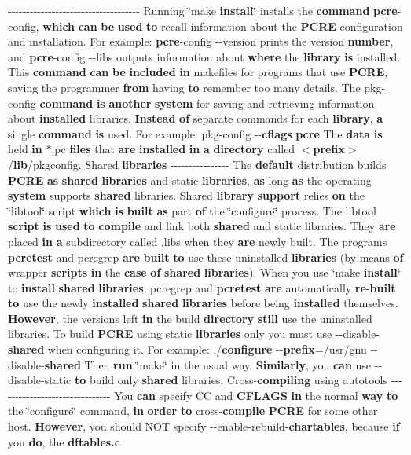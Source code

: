 -\/-\/-\/-\/-\/-\/-\/-\/-\/-\/-\/-\/-\/-\/-\/-\/-\/-\/-\/-\/-\/-\/-\/-\/-\/-\/-\/-\/-\/-\/-\/-\/-\/-\/-\/-\/ Running \char`\"{}make {\bf install}\char`\"{} installs the {\bf command} {\bf pcre}-\/config, {\bf which} {\bf can} {\bf be} {\bf used} {\bf to} recall information about the {\bf P\+C\+RE} configuration and installation. For example\+: {\bf pcre}-\/config -\/-\/version prints the version {\bf number}, and {\bf pcre}-\/config -\/-\/libs outputs information about {\bf where} the {\bf library} {\bf is} installed. This {\bf command} {\bf can} {\bf be} {\bf included} {\bf in} makefiles for programs that use {\bf P\+C\+RE}, saving the programmer {\bf from} having {\bf to} remember too many details. The pkg-\/config {\bf command} {\bf is} {\bf another} {\bf system} for saving and retrieving information about {\bf installed} libraries. {\bf Instead} {\bf of} separate commands for each {\bf library}, {\bf a} single {\bf command} {\bf is} used. For example\+: pkg-\/config -\/-\/{\bf cflags} {\bf pcre} The {\bf data} {\bf is} held {\bf in} $\ast$.pc {\bf files} that {\bf are} {\bf installed} {\bf in} {\bf a} {\bf directory} called $<${\bf prefix}$>$/{\bf lib}/pkgconfig. Shared {\bf libraries} -\/-\/-\/-\/-\/-\/-\/-\/-\/-\/-\/-\/-\/-\/-\/-\/ The {\bf default} distribution builds {\bf P\+C\+RE} {\bf as} {\bf shared} {\bf libraries} and static {\bf libraries}, {\bf as} long {\bf as} the operating {\bf system} supports {\bf shared} libraries. Shared {\bf library} {\bf support} relies {\bf on} the \char`\"{}libtool\char`\"{} script {\bf which} {\bf is} {\bf built} {\bf as} part {\bf of} the \char`\"{}configure\char`\"{} process. The libtool {\bf script} {\bf is} {\bf used} {\bf to} {\bf compile} and link both {\bf shared} and static libraries. They {\bf are} placed {\bf in} {\bf a} subdirectory called .libs when they {\bf are} newly built. The programs {\bf pcretest} and pcregrep {\bf are} {\bf built} {\bf to} use these uninstalled {\bf libraries} (by means {\bf of} wrapper {\bf scripts} {\bf in} the {\bf case} {\bf of} {\bf shared} {\bf libraries}). When you use \char`\"{}make {\bf install}\char`\"{} to {\bf install} {\bf shared} {\bf libraries}, pcregrep and {\bf pcretest} {\bf are} automatically {\bf re}-\/{\bf built} {\bf to} use the newly {\bf installed} {\bf shared} {\bf libraries} before being {\bf installed} themselves. {\bf However}, the versions left {\bf in} the build {\bf directory} {\bf still} use the uninstalled libraries. To build {\bf P\+C\+RE} using static {\bf libraries} only you must use -\/-\/disable-\/{\bf shared} when configuring it. For example\+: ./{\bf configure} -\/-\/{\bf prefix}=/usr/gnu -\/-\/disable-\/{\bf shared} Then {\bf run} \char`\"{}make\char`\"{} in the usual way. {\bf Similarly}, you {\bf can} use -\/-\/disable-\/static {\bf to} build only {\bf shared} libraries. Cross-\/{\bf compiling} using autotools -\/-\/-\/-\/-\/-\/-\/-\/-\/-\/-\/-\/-\/-\/-\/-\/-\/-\/-\/-\/-\/-\/-\/-\/-\/-\/-\/-\/-\/-\/-\/ You {\bf can} specify CC and {\bf C\+F\+L\+A\+GS} {\bf in} the normal {\bf way} {\bf to} the \char`\"{}configure\char`\"{} command, {\bf in} {\bf order} {\bf to} cross-\/{\bf compile} {\bf P\+C\+RE} for some other host. {\bf However}, you should N\+OT specify -\/-\/enable-\/rebuild-\/{\bf chartables}, because {\bf if} you {\bf do}, the {\bf dftables.\+c} 